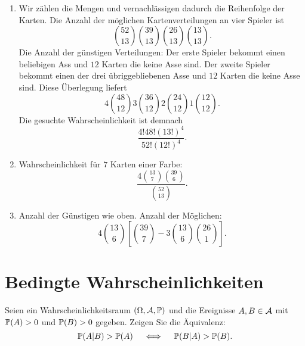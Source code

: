 \solution 
\begin{enumerate}
    \item Wir zählen die Mengen und vernachlässigen dadurch die Reihenfolge der Karten.
        Die Anzahl der möglichen Kartenverteilungen an vier Spieler ist 
        \begin{equation*}
            \binom{52}{13}\binom{39}{13}\binom{26}{13}\binom{13}{13}.
        \end{equation*}
        Die Anzahl der günstigen Verteilungen: Der erste Spieler bekommt einen beliebigen
        Ass und $12$ Karten die keine Asse sind. Der zweite Spieler bekommt einen der drei
        übriggebliebenen Asse und $12$ Karten die keine Asse sind. Diese Überlegung liefert
        \begin{equation*}
            4 \binom{48}{12} 3 \binom{36}{12} 2 \binom{24}{12} 1 \binom{12}{12}.
        \end{equation*}
        Die gesuchte Wahrscheinlichkeit ist demnach
        \begin{equation*}
            \frac{4! 48!  \left( 13! \right)^4}{ 52! \left( 12! \right)^4 }. 
        \end{equation*}
    \item Wahrscheinlichkeit für $7$ Karten einer Farbe:
        \begin{equation*}
            \frac{4 \binom{13}{7} \binom{39}{6}}{ \binom{52}{13}}.
        \end{equation*}
    \item Anzahl der Günstigen wie oben. Anzahl der Möglichen:
        \begin{equation*}
            4 \binom{13}{6} \left[ \binom{39}{7} - 3 \binom{13}{6} \binom{26}{1}  \right].
        \end{equation*}
\end{enumerate}

\section{Bedingte Wahrscheinlichkeiten}


Seien ein Wahrscheinlichkeitsraum $\left( \Omega, \mathcal A, \mathbb P \right)$ und die
Ereignisse $A,B\in \mathcal A$ mit $\mathbb P(A)>0$ und $\mathbb P(B)>0$ gegeben.  Zeigen Sie die
Äquivalenz:
\begin{equation*}
    \mathbb P(A | B ) > \mathbb P(A) \quad \iff \quad \mathbb P(B | A) > \mathbb P(B).
\end{equation*}

